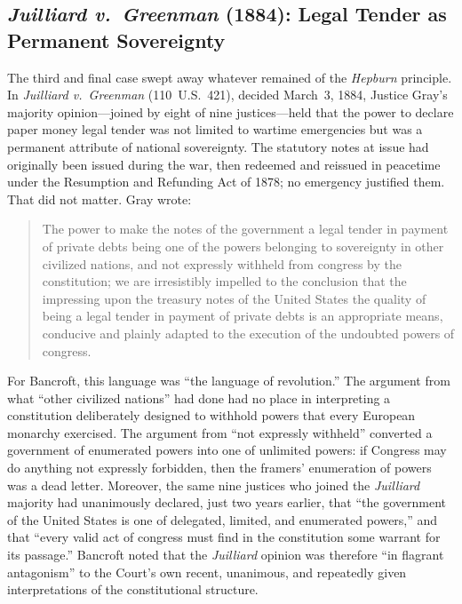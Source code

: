 \documentclass[12pt]{article}
\begin{document}
\subsection{\textit{Juilliard v.\ Greenman} (1884): Legal Tender as
             Permanent Sovereignty}

The third and final case swept away whatever remained of the
\textit{Hepburn} principle.  In \textit{Juilliard v.\ Greenman}
(110~U.S.\ 421), decided March~3, 1884, Justice Gray's majority
opinion---joined by eight of nine justices---held that the power to
declare paper money legal tender was not limited to wartime emergencies
but was a permanent attribute of national sovereignty.  The statutory
notes at issue had originally been issued during the war, then redeemed
and reissued in peacetime under the Resumption and Refunding Act of
1878; no emergency justified them.  That did not matter.  Gray wrote:

\begin{quote}
The power to make the notes of the government a legal tender in payment
of private debts being one of the powers belonging to sovereignty in
other civilized nations, and not expressly withheld from congress by
the constitution; we are irresistibly impelled to the conclusion that
the impressing upon the treasury notes of the United States the quality
of being a legal tender in payment of private debts is an appropriate
means, conducive and plainly adapted to the execution of the undoubted
powers of congress.
\end{quote}

For Bancroft, this language was ``the language of revolution.''
The argument from what ``other civilized nations'' had done had no place
in interpreting a constitution deliberately designed to withhold powers
that every European monarchy exercised.  The argument from ``not
expressly withheld'' converted a government of enumerated powers into
one of unlimited powers: if Congress may do anything not expressly
forbidden, then the framers' enumeration of powers was a
dead letter.  Moreover, the same nine justices who joined the
\textit{Juilliard} majority had unanimously declared, just two years
earlier, that ``the government of the United States is one of delegated,
limited, and enumerated powers,'' and that ``every valid act of congress
must find in the constitution some warrant for its passage.''  Bancroft
noted that the \textit{Juilliard} opinion was therefore ``in
flagrant antagonism'' to the Court's own recent, unanimous, and
repeatedly given interpretations of the constitutional structure.
\end{document}
